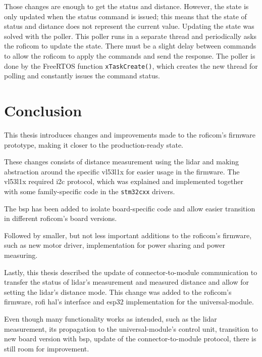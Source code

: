 \documentclass[
  digital,     %
  oneside,     %
  nosansbold,  %
  nocolorbold, %
  nolof,         %
  nolot,         %
]{fithesis4}
\begin{document}
{{{Those changes are enough to get the status and distance. However, the state is only updated when the status command is issued; this means that the state of status and distance does not represent the current value. Updating the state was solved with the poller. This poller runs in a separate thread and periodically asks the \acrshort{roficom} to update the state. There must be a slight delay between commands to allow the \acrshort{roficom} to apply the commands and send the response. The poller is done by the FreeRTOS function \lstinline|xTaskCreate()|, which creates the new thread for polling and constantly issues the command status.

\chapter{Conclusion}

This thesis introduces changes and improvements made to the \acrshort{roficom}'s firmware prototype, making it closer to the production-ready state.

These changes consists of distance measurement using the \acrshort{lidar} and making abstraction around the specific \gls{vl53l1x} for easier usage in the firmware. The \gls{vl53l1x} required \acrshort{i2c} protocol, which was explained and implemented together with some family-specific code in the \verb|stm32cxx| drivers.

The \acrlong{bsp} has been added to isolate board-specific code and allow easier transition in different \acrshort{roficom}'s board versions.

Followed by smaller, but not less important additions to the \acrshort{roficom}'s firmware, such as new motor driver, implementation for power sharing and power measuring.

Lastly, this thesis described the update of connector-to-module communication to transfer the status of \acrshort{lidar}'s measurement and measured distance and allow for setting the \acrshort{lidar}'s distance mode. This change was added to the \acrshort{roficom}'s firmware, \acrshort{rofi} \acrshort{hal}'s interface and esp32 implementation for the \gls{universal-module}.

Even though many functionality works as intended, such as the \acrshort{lidar} measurement, its propagation to the \gls{universal-module}'s control unit, transition to new board version with \acrlong{bsp}, update of the connector-to-module protocol, there is still room for improvement.

}}}
\end{document}
